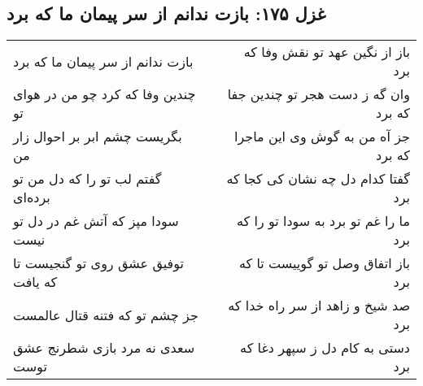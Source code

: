 \begin{center}
\section*{غزل ۱۷۵: بازت ندانم از سر پیمان ما که برد}
\label{sec:175}
\begin{longtable}{l p{0.5cm} r}
بازت ندانم از سر پیمان ما که برد
&&
باز از نگین عهد تو نقش وفا که برد
\\
چندین وفا که کرد چو من در هوای تو
&&
وان گه ز دست هجر تو چندین جفا که برد
\\
بگریست چشم ابر بر احوال زار من
&&
جز آه من به گوش وی این ماجرا که برد
\\
گفتم لب تو را که دل من تو برده‌ای
&&
گفتا کدام دل چه نشان کی کجا که برد
\\
سودا مپز که آتش غم در دل تو نیست
&&
ما را غم تو برد به سودا تو را که برد
\\
توفیق عشق روی تو گنجیست تا که یافت
&&
باز اتفاق وصل تو گوییست تا که برد
\\
جز چشم تو که فتنه قتال عالمست
&&
صد شیخ و زاهد از سر راه خدا که برد
\\
سعدی نه مرد بازی شطرنج عشق توست
&&
دستی به کام دل ز سپهر دغا که برد
\\
\end{longtable}
\end{center}
